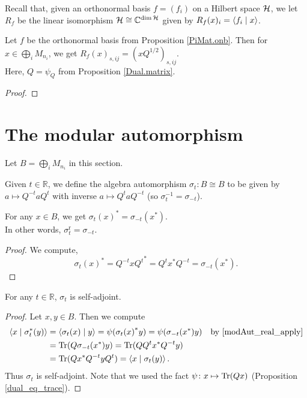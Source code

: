  Recall that, given an orthonormal basis $f=(f_i)$ on a Hilbert space $\mathcal{H}$, we let $R_f$ be the linear isomorphism $\mathcal{H} \cong \mathbb{C}^{\dim\mathcal{H}}$ given by $R_f(x)_i=\left\langle f_i \mid x\right\rangle$.
 \begin{proposition}\label{PiMat.onb_repr}\leanok
  Let $f$ be the orthonormal basis from Proposition \ref{PiMat.onb}.
  Then for $x\in\bigoplus_iM_{n_i}$, we get $R_f(x)_{s,ij}=(xQ^{1/2})_{s,ij}$.\\
  Here, $Q=\psi_Q$ from Proposition \ref{Dual.matrix}.
 \end{proposition}
 \begin{proof}
 \end{proof}

\section{The modular automorphism}
 Let $B=\bigoplus_iM_{n_i}$ in this section.

 \begin{definition}\label{modAut}
  \leanok
  Given $t\in\mathbb{R}$, we define the algebra automorphism $\sigma_t\colon B\cong B$ to be given by $a\mapsto Q^{-t}aQ^{t}$ with inverse $a\mapsto Q^taQ^{-t}$ (so $\sigma_t^{-1}=\sigma_{-t}$).
 \end{definition}

 \begin{proposition}\label{modAut_real_apply}
  \leanok
  For any $x\in B$, we get ${\sigma_{t}(x)}^*=\sigma_{-t}(x^*)$.\\
  In other words, $\sigma_t^{\operatorname{r}}=\sigma_{-t}$.
 \end{proposition}
 \begin{proof}\leanok
  We compute,
  \[{\sigma_{t}(x)}^*={Q^{-t}xQ^t}^*=Q^tx^*Q^{-t}=\sigma_{-t}(x^*).\]
 \end{proof}
 
 \begin{proposition}\label{modAut_isSelfAdjoint}
  \leanok
  For any $t\in\mathbb{R}$, $\sigma_t$ is self-adjoint.
 \end{proposition}
 \begin{proof}\leanok
  Let $x,y\in{B}$. Then we compute
  \begin{align*}
   \left\langle x \mid \sigma_{t}^*(y)\right\rangle &= \left\langle\sigma_{t}(x) \mid y\right\rangle=\psi({\sigma_{t}(x)}^*y)=\psi(\sigma_{-t}(x^*)y) &\text{by \ref{modAut_real_apply}}\\
   &=\operatorname{Tr}(Q\sigma_{-t}(x^*)y)=\operatorname{Tr}(QQ^tx^*Q^{-t}y)\\
   &= \operatorname{Tr}(Q x^*Q^{-t}yQ^t)=\left\langle x \mid \sigma_{t}(y)\right\rangle.
  \end{align*}
  Thus $\sigma_{t}$ is self-adjoint. Note that we used the fact $\psi\colon x\mapsto\operatorname{Tr}(Q x)$ (Proposition \ref{dual_eq_trace}).
 \end{proof}

